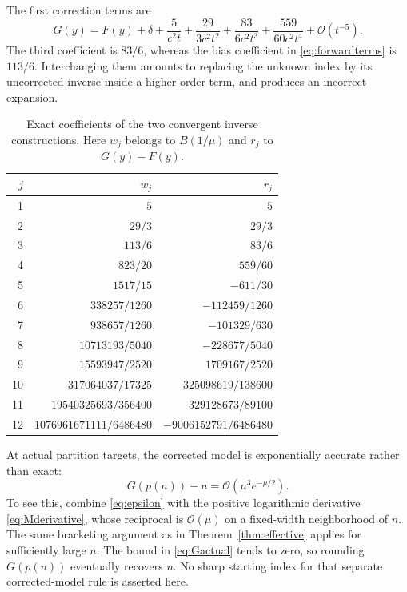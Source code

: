 \documentclass[11pt]{article}
\numberwithin{equation}{section}
\theoremstyle{definition}
\theoremstyle{remark}
\newcommand{\OO}{\mathcal O}
\begin{document}
The first correction terms are
\begin{equation}\label{eq:Gfirst}
 G(y)=F(y)+\delta+\frac5{c^2t}
 +\frac{29}{3c^2t^2}+\frac{83}{6c^2t^3}
 +\frac{559}{60c^2t^4}+\OO(t^{-5}).
\end{equation}
The third coefficient is $83/6$, whereas the bias coefficient in
\eqref{eq:forwardterms} is $113/6$. Interchanging them amounts to
replacing the unknown index by its uncorrected inverse inside a
higher-order term, and produces an incorrect expansion.

\begin{table}[tbp]
\centering
\caption{Exact coefficients of the two convergent inverse constructions.
Here $w_j$ belongs to $B(1/\mu)$ and $r_j$ to $G(y)-F(y)$.}\label{tab:coeffs}
\medskip
\begin{tabular}{@{}r rr@{}}
\toprule
$j$ & $w_j$ & $r_j$\\
\midrule
1 & $5$ & $5$\\
2 & $29/3$ & $29/3$\\
3 & $113/6$ & $83/6$\\
4 & $823/20$ & $559/60$\\
5 & $1517/15$ & $-611/30$\\
6 & $338257/1260$ & $-112459/1260$\\
7 & $938657/1260$ & $-101329/630$\\
8 & $10713193/5040$ & $-228677/5040$\\
9 & $15593947/2520$ & $1709167/2520$\\
10 & $317064037/17325$ & $325098619/138600$\\
11 & $19540325693/356400$ & $329128673/89100$\\
12 & $1076961671111/6486480$ & $-9006152791/6486480$\\
\bottomrule
\end{tabular}
\end{table}

At actual partition targets, the corrected model is exponentially
accurate rather than exact:
\begin{equation}\label{eq:Gactual}
 G(p(n))-n=\OO(\mu^3e^{-\mu/2}).
\end{equation}
To see this, combine \eqref{eq:epsilon} with the positive logarithmic
derivative \eqref{eq:Mderivative}, whose reciprocal is $\OO(\mu)$
on a fixed-width neighborhood of $n$. The same bracketing argument as
in Theorem~\ref{thm:effective} applies for sufficiently large $n$.
The bound in \eqref{eq:Gactual} tends to zero, so rounding $G(p(n))$
eventually recovers $n$. No sharp starting index for that separate
corrected-model rule is asserted here.
\end{document}
